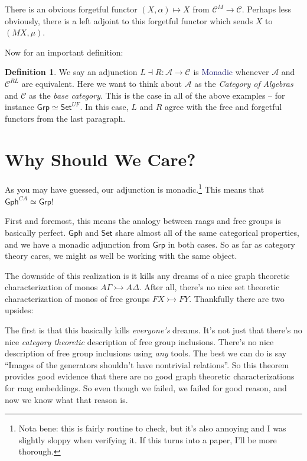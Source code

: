 \documentclass[12pt]{article}
\theoremstyle{definition}
\newtheorem{defn}{Definition}
\newcommand*{\catFont}[1]{\mathsf{#1}}
\newcommand*{\catVarFont}[1]{\mathcal{#1}}
\newcommand{\Set}{\catFont{Set}}
\newcommand{\Grp}{\catFont{Grp}}
\newcommand{\Gph}{\catFont{Gph}}
\newcommand{\cata}{\catVarFont{A}}
\newcommand{\catc}{\catVarFont{C}}
\newcommand{\monor}{\rightarrowtail}
\newcommand*{\important}[1]{\textcolor{MidnightBlue}{#1}}
\begin{document}
\begin{center}
\end{center}

There is an obvious forgetful functor $(X,\alpha) \mapsto X$ from 
$\catc^M \to \catc$. Perhaps less obviously, there is a left adjoint 
to this forgetful functor which sends $X$ to $(MX,\mu)$.

Now for an important definition: 

\begin{defn}
We say an adjunction $L \dashv R : \cata \to \catc$ is \important{Monadic}
whenever $\cata$ and $\catc^{RL}$ are equivalent. Here we want to
think about $\cata$ as the \emph{Category of Algebras} and $\catc$ as the 
\emph{base category}. This is the case in all of the above examples -- 
for instance $\Grp \simeq \Set^{UF}$. In this case, $L$ and $R$ agree
with the free and forgetful functors from the last paragraph.
\end{defn}

\section{Why Should We Care?}

As you may have guessed, our adjunction is monadic.\footnote{%
Nota bene: this is fairly routine to check, but it's also
annoying and I was slightly sloppy when verifying it. If this turns into a paper, I'll be more thorough.} 
This means that $\Gph^{CA} \simeq \Grp$!

First and foremost, this means the analogy between raags and free groups 
is basically perfect. $\Gph$ and $\Set$ share almost all of the same 
categorical properties, and we have a monadic adjunction from $\Grp$ in both
cases. So as far as category theory cares, we might as well be working 
with the same object.

The downside of this realization is it kills any dreams of a nice 
graph theoretic characterization of monos $A\Gamma \monor A\Delta$.
After all, there's no nice set theoretic characterization of monos of 
free groups $FX \monor FY$. Thankfully there are two upsides:

The first is that this basically kills \emph{everyone's} dreams. 
It's not just that there's no nice \emph{category theoretic} description
of free group inclusions. There's no nice description of free group inclusions
using \emph{any} tools. The best we can do is say 
``Images of the generators shouldn't have nontrivial relations''. So 
this theorem provides good evidence that there are no good graph theoretic
characterizations for raag embeddings. So even though we failed, we failed for
good reason, and now we know what that reason is.
\end{document}
